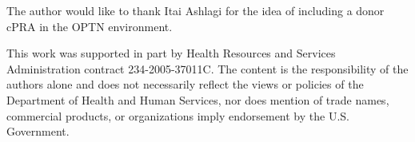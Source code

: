 \documentclass[format=acmsmall, review=false]{acmart}
\begin{document}
\begin{acks}
	

The author would like to thank Itai Ashlagi for the idea of including a donor cPRA in the OPTN environment.

This work was supported in part by Health Resources and Services Administration contract 234-2005-37011C. The content is the responsibility of the authors alone and does not necessarily reflect the views or policies of the Department of Health and Human Services, nor does mention of trade names, commercial products, or organizations imply endorsement by the U.S. Government.

	
\end{acks}



\end{document}
